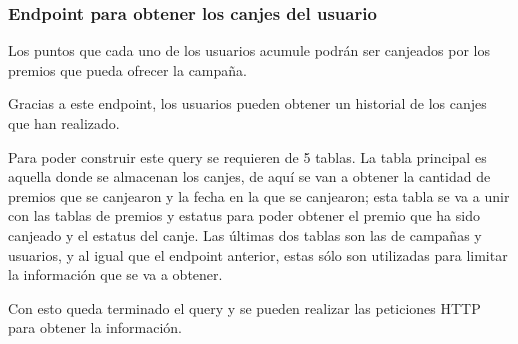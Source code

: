 \subsubsection{Endpoint para obtener los canjes del usuario}
Los puntos que cada uno de los usuarios acumule podrán ser canjeados por los premios que pueda ofrecer la campaña.  

Gracias a este endpoint, los usuarios pueden obtener un historial de los canjes que han realizado.

Para poder construir este query se requieren de 5 tablas. La tabla principal es aquella donde se almacenan los canjes, de aquí se van a obtener la cantidad de premios que se canjearon y la fecha en la que se canjearon; esta tabla se va a unir con las tablas de premios y estatus para poder obtener el premio que ha sido canjeado y el estatus del canje. 
Las últimas dos tablas son las de campañas y usuarios, y al igual que el endpoint anterior, estas sólo son utilizadas para limitar la información que se va a obtener.

Con esto queda terminado el query y se pueden realizar las peticiones HTTP para obtener la información.